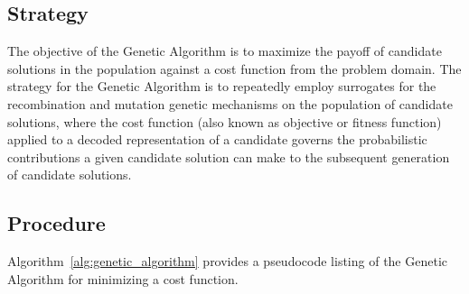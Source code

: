 \subsection{Strategy}
The objective of the Genetic Algorithm is to maximize the payoff of candidate solutions in the population against a cost function from the problem domain. 
The strategy for the Genetic Algorithm is to repeatedly employ surrogates for the recombination and mutation genetic mechanisms on the population of candidate solutions, where the cost function (also known as objective or fitness function) applied to a decoded representation of a candidate governs the probabilistic contributions a given candidate solution can make to the subsequent generation of candidate solutions.

\subsection{Procedure}
Algorithm~\ref{alg:genetic_algorithm} provides a pseudocode listing of the Genetic Algorithm for minimizing a cost function. 

